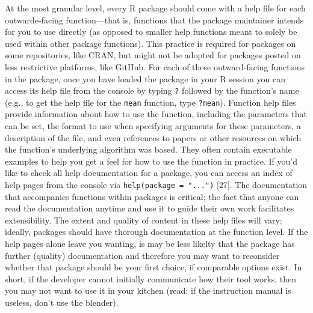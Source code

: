 \documentclass[10pt,letterpaper]{article}
\begin{document}
At the most granular level, every R package should come with a help file
for each outwarde-facing function---that is, functions that the package
maintainer intends for you to use directly (as opposed to smaller help
functions meant to solely be used within other package functions). This
practice is required for packages on some repositories, like CRAN, but
might not be adopted for packages posted on less restrictive platforms,
like GitHub. For each of these outward-facing functions in the package,
once you have loaded the package in your R session you can access its
help file from the console by typing \texttt{?} followed by the
function's name (e.g., to get the help file for the \texttt{mean}
function, type \texttt{?mean}). Function help files provide information
about how to use the function, including the parameters that can be set,
the format to use when specifying arguments for these parameters, a
description of the file, and even references to papers or other
resources on which the function's underlying algorithm was based. They
often contain executable examples to help you get a feel for how to use
the function in practice. If you'd like to check all help documentation
for a package, you can access an index of help pages from the console
via \texttt{help(package\ =\ "...")} {[}27{]}. The documentation that
accompanies functions within packages is critical; the fact that anyone
can read the documentation anytime and use it to guide their own work
facilitates extensibility. The extent and quality of content in these
help files will vary; ideally, packages should have thorough
documentation at the function level. If the help pages alone leave you
wanting, is may be less likelty that the package has further (quality)
documentation and therefore you may want to reconsider whether that
package should be your first choice, if comparable options exist. In
short, if the developer cannot initially communicate how their tool
works, then you may not want to use it in your kitchen (read: if the
instruction manual is useless, don't use the blender).
\end{document}
